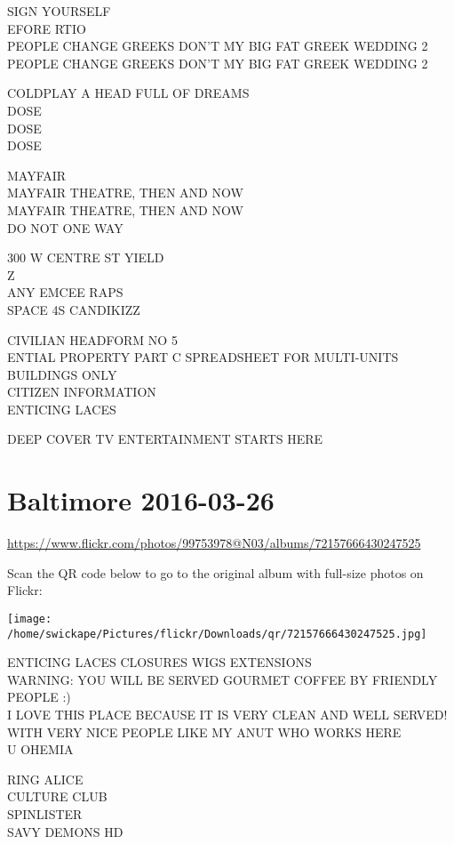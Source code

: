 \documentclass[10pt,letterpaper]{article}
\begin{document}
SIGN YOURSELF\\
EFORE RTIO\\
PEOPLE CHANGE GREEKS DON'T MY BIG FAT GREEK WEDDING 2\\
PEOPLE CHANGE GREEKS DON'T MY BIG FAT GREEK WEDDING 2

COLDPLAY A HEAD FULL OF DREAMS\\
DOSE\\
DOSE\\
DOSE

MAYFAIR\\
MAYFAIR THEATRE, THEN AND NOW\\
MAYFAIR THEATRE, THEN AND NOW\\
DO NOT ONE WAY

300 W CENTRE ST YIELD\\
Z\\
ANY EMCEE RAPS\\
SPACE 4S CANDIKIZZ

CIVILIAN HEADFORM NO 5\\
ENTIAL PROPERTY PART C SPREADSHEET FOR MULTI{-}UNITS BUILDINGS ONLY\\
CITIZEN INFORMATION\\
ENTICING LACES

DEEP COVER TV ENTERTAINMENT STARTS HERE
\pagebreak

\section*{Baltimore 2016-03-26}

\url{https://www.flickr.com/photos/99753978@N03/albums/72157666430247525}

Scan the QR code below to go to the original album with full-size photos on Flickr:

\texttt{[image: /home/swickape/Pictures/flickr/Downloads/qr/72157666430247525.jpg]}
\pagebreak

ENTICING LACES CLOSURES WIGS EXTENSIONS\\
WARNING: YOU WILL BE SERVED GOURMET COFFEE BY FRIENDLY PEOPLE :)\\
I LOVE THIS PLACE BECAUSE IT IS VERY CLEAN AND WELL SERVED!  WITH VERY NICE PEOPLE LIKE MY ANUT WHO WORKS HERE\\
U OHEMIA

RING ALICE\\
CULTURE CLUB\\
SPINLISTER\\
SAVY DEMONS HD
\end{document}
